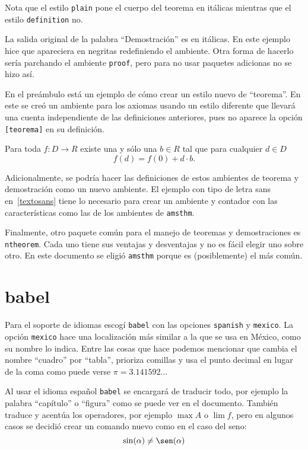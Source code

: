Nota que el estilo \texttt{plain} pone el cuerpo del teorema en itálicas
mientras que el estilo \texttt{definition} no.

La salida original de la palabra ``Demostración'' es en itálicas. En este
ejemplo hice que apareciera en negritas redefiniendo el ambiente. Otra forma
de hacerlo sería parchando el ambiente \texttt{proof}, pero para no usar
paquetes adicionas no se hizo así.

En el preámbulo está un ejemplo de cómo crear un estilo nuevo de
``teorema''. En este se creó un ambiente para los axiomas usando un estilo
diferente que llevará una cuenta independiente de las  definiciones
anteriores, pues no aparece la opción \texttt{[teorema]} en su definición.

\begin{axioma}
  Para toda \(f\colon D\to R\) existe una y sólo una \(b\in R\) tal que para
  cualquier \(d\in D\)
  \[
    f(d)=f(0)+d\cdot b.
  \]
\end{axioma}

Adicionalmente, se podría hacer las definiciones de estos ambientes de
teorema y demostración como un nuevo ambiente. El ejemplo con tipo de letra
sans en~\ref{textosans} tiene lo necesario para crear un ambiente y contador
con las características como las de los ambientes de \texttt{amsthm}.

Finalmente, otro paquete común para el manejo de teoremas y demostraciones
es \texttt{ntheorem}. Cada uno tiene sus ventajas y desventajas y no es
fácil elegir uno sobre otro. En este documento se eligió \texttt{amsthm}
porque es (posiblemente) el más común.


\section{babel}
Para el soporte de idiomas escogí \texttt{babel} con las opciones
\texttt{spanish} y \texttt{mexico}. La opción \texttt{mexico} hace una
localización más similar a la que se usa en México, como su nombre lo indica.
Entre las cosas que hace podemos mencionar que cambia el nombre ``cuadro''
por ``tabla'', prioriza comillas y usa el punto decimal en lugar de la coma
como puede verse \(\pi=3.141592\ldots \)

Al usar el idioma español \texttt{babel} se encargará de traducir todo, por ejemplo la palabra ``capítulo'' o ``figura'' como se puede ver en el documento. También traduce y acentúa los operadores, por ejemplo \(\max A\) o \(\lim f\), pero en algunos casos se decidió crear un comando nuevo como en el caso del seno:
\[
  \sin(\alpha)\ne\sen(\alpha)
\]

